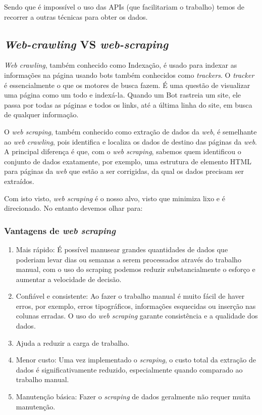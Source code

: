 \documentclass[a4paper,10pt]{article}
\begin{document}
Sendo que é impossível o uso das APIs (que facilitariam o trabalho) temos de recorrer a outras técnicas para obter os dados.

\subsection{\textit{Web-crawling} VS \textit{web-scraping}}

\textit{Web crawling}, também conhecido como Indexação, é usado para indexar as informações na página usando bots também conhecidos como \textit{trackers}.
O \textit{tracker} é essencialmente o que os motores de busca fazem.
É uma questão de visualizar uma página como um todo e indexá-la.
Quando um Bot rastreia um site, ele passa por todas as páginas e todos os links, até a última linha do site, em busca de qualquer informação.

O \textit{web scraping}, também conhecido como extração de dados da \textit{web}, é semelhante ao \textit{web crawling}, pois identifica e localiza os dados de destino das páginas da \textit{web}.
A principal diferença é que, com o \textit{web scraping}, sabemos quem identificou o conjunto de dados exatamente, por exemplo, uma estrutura de elemento HTML para páginas da \textit{web} que estão a ser corrigidas, da qual os dados precisam ser extraídos.

Com isto visto, \textit{web scraping} é o nosso alvo, visto que minimiza lixo e é direcionado.
No entanto devemos olhar para:

\subsubsection{Vantagens de \textit{web scraping}}

\begin{enumerate}
    \item Mais rápido: É possível manusear grandes quantidades de dados que poderiam levar dias ou semanas a serem processados através do trabalho manual, com o uso do scraping podemos reduzir substancialmente o esforço e aumentar a velocidade de decisão.
    \item Confiável e consistente: Ao fazer o trabalho manual é muito fácil de haver erros, por exemplo, erros tipográficos, informações esquecidas ou inserção nas colunas erradas. O uso do \textit{web scraping} garante consistência e a qualidade dos dados.
    \item Ajuda a reduzir a carga de trabalho.
    \item Menor custo: Uma vez implementado o \textit{scraping}, o custo total da extração de dados é significativamente reduzido, especialmente quando comparado ao trabalho manual.
    \item Manutenção básica: Fazer o \textit{scraping} de dados geralmente não requer muita manutenção.
\end{enumerate}
\end{document}
